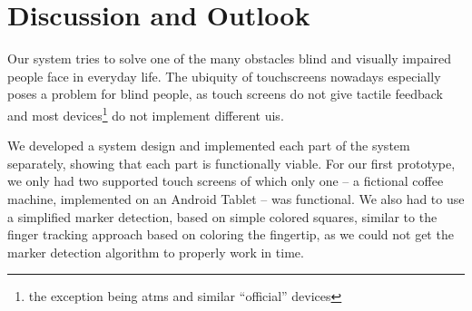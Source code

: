 \section{Discussion and Outlook}
Our system tries to solve one of the many obstacles blind and visually impaired people face in everyday life.
The ubiquity of touchscreens nowadays especially poses a problem for blind people, as touch screens do not give tactile feedback and most devices\footnote{the exception being \acp{atm} and similar \enquote{official} devices} do not implement different \acp{ui}.

We developed a system design and implemented each part of the system separately, showing that each part is functionally viable.
For our first prototype, we only had two supported touch screens of which only one -- a fictional coffee machine, implemented on an Android Tablet -- was functional.
We also had to use a simplified marker detection, based on simple colored squares, similar to the finger tracking approach based on coloring the fingertip, as we could not get the marker detection algorithm to properly work in time.

